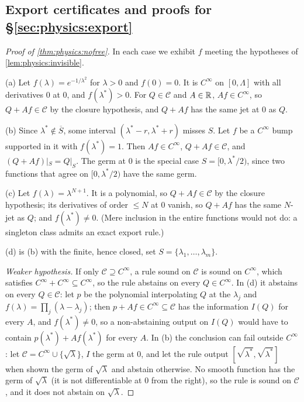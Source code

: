 \subsection{Export certificates and proofs for \S\ref{sec:physics:export}}\label{app:physics:certificates}

\begin{proof}[Proof of \cref{thm:physics:nofree}]
In each case we exhibit $f$ meeting the hypotheses of \cref{lem:physics:invisible}.

(a) Let $f(\lambda)=e^{-1/\lambda^2}$ for $\lambda>0$ and $f(0)=0$. It is $C^\infty$ on
$[0,\Lambda]$ with all derivatives $0$ at $0$, and $f(\lambda^*)>0$. For $Q\in\mathcal C$ and
$A\in\mathbb{R}$, $Af\in C^\infty$, so $Q+Af\in\mathcal C$ by the closure hypothesis, and $Q+Af$ has
the same jet at $0$ as $Q$.

(b) Since $\lambda^*\notin\overline S$, some interval $(\lambda^*-r,\lambda^*+r)$ misses $S$.
Let $f$ be a $C^\infty$ bump supported in it with $f(\lambda^*)=1$. Then $Af\in C^\infty$,
$Q+Af\in\mathcal C$, and $(Q+Af)|_S=Q|_S$. The germ at $0$ is the special case
$S=[0,\lambda^*/2)$, since two functions that agree on $[0,\lambda^*/2)$ have the same germ.

(c) Let $f(\lambda)=\lambda^{N+1}$. It is a polynomial, so $Q+Af\in\mathcal C$ by the closure
hypothesis; its derivatives of order $\le N$ at $0$ vanish, so $Q+Af$ has the same $N$-jet
as $Q$; and $f(\lambda^*)\neq0$. (Mere inclusion in the entire functions would not do: a
singleton class admits an exact export rule.)

(d) is (b) with the finite, hence closed, set $S=\{\lambda_1,\dots,\lambda_m\}$.

\emph{Weaker hypothesis.} If only $\mathcal C\supseteq C^\infty$, a rule sound on $\mathcal C$ is
sound on $C^\infty$, which satisfies $C^\infty+C^\infty\subseteq C^\infty$, so the rule
abstains on every $Q\in C^\infty$. In (d) it abstains on every $Q\in\mathcal C$: let $p$ be the
polynomial interpolating $Q$ at the $\lambda_j$ and $f(\lambda)=\prod_j(\lambda-\lambda_j)$;
then $p+Af\in C^\infty\subseteq\mathcal C$ has the information $I(Q)$ for every $A$, and
$f(\lambda^*)\neq0$, so a non-abstaining output on $I(Q)$ would have to contain
$p(\lambda^*)+Af(\lambda^*)$ for every $A$. In (b) the conclusion can fail outside
$C^\infty$: let
$\mathcal C=C^\infty\cup\{\sqrt\lambda\}$, $I$ the germ at $0$, and let the rule output
$[\sqrt{\lambda^*},\sqrt{\lambda^*}]$ when shown the germ of $\sqrt\lambda$ and abstain
otherwise. No smooth function has the germ of $\sqrt\lambda$ (it is not differentiable at
$0$ from the right), so the rule is sound on $\mathcal C$, and it does not abstain on
$\sqrt\lambda$.
\end{proof}

